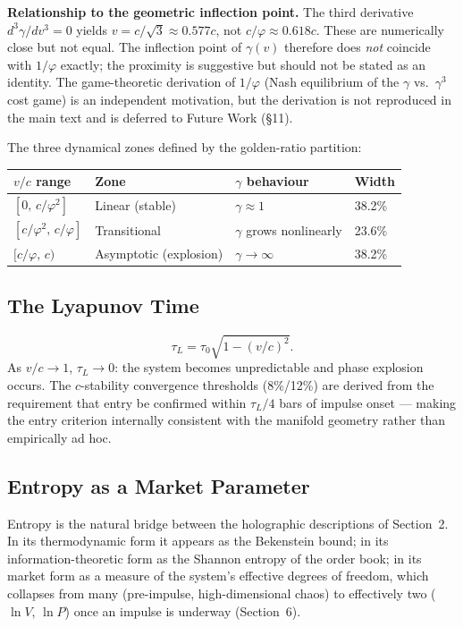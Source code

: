 \documentclass[12pt,a4paper]{article}
\begin{document}
\textbf{Relationship to the geometric inflection point.}\quad
The third derivative $d^3\gamma/dv^3 = 0$ yields
$v = c/\sqrt{3} \approx 0.577c$, not $c/\varphi \approx 0.618c$.
These are numerically close but not equal. The inflection point of
$\gamma(v)$ therefore does \emph{not} coincide with $1/\varphi$ exactly;
the proximity is suggestive but should not be stated as an identity.
The game-theoretic derivation of $1/\varphi$ (Nash equilibrium of the
$\gamma$ vs.\ $\gamma^3$ cost game) is an independent motivation, but
the derivation is not reproduced in the main text and is deferred to
Future Work (\S11).

The three dynamical zones defined by the golden-ratio partition:

\begin{center}
\begin{tabular}{llll}
\toprule
$v/c$ range & Zone & $\gamma$ behaviour & Width \\
\midrule
$[0,\,c/\varphi^2]$ & Linear (stable) & $\gamma\approx 1$ & 38.2\% \\
$[c/\varphi^2,\,c/\varphi]$ & Transitional & $\gamma$ grows nonlinearly & 23.6\% \\
$[c/\varphi,\,c)$ & Asymptotic (explosion) & $\gamma\to\infty$ & 38.2\% \\
\bottomrule
\end{tabular}
\end{center}

\subsection{The Lyapunov Time}
\begin{equation}
    \boxed{\tau_L = \tau_0\sqrt{1-(v/c)^2}}.
\end{equation}
As $v/c\to1$, $\tau_L\to0$: the system becomes unpredictable and phase
explosion occurs. The $c$-stability convergence thresholds (8\%/12\%) are
derived from the requirement that entry be confirmed within $\tau_L/4$
bars of impulse onset --- making the entry criterion internally consistent
with the manifold geometry rather than empirically ad hoc.

\subsection{Entropy as a Market Parameter}
\label{sec:entropy}

Entropy is the natural bridge between the holographic descriptions of
Section~2. In its thermodynamic form it appears as the Bekenstein bound;
in its information-theoretic form as the Shannon entropy of the order
book; in its market form as a measure of the system's effective degrees
of freedom, which collapses from many (pre-impulse, high-dimensional
chaos) to effectively two ($\ln V$, $\ln P$) once an impulse is
underway (Section~6).
\end{document}
